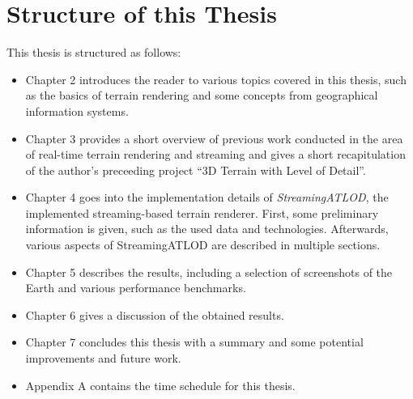 \section{Structure of this Thesis}
This thesis is structured as follows:
\begin{itemize}
  \item Chapter 2 introduces the reader to various topics covered in this thesis, such as 
  the basics of terrain rendering and some concepts from geographical information systems.
  \item Chapter 3 provides a short overview of previous work conducted in the area of real-time terrain rendering and streaming and 
        gives a short recapitulation of the author's preceeding project ``3D Terrain with Level of Detail''.
  \item Chapter 4 goes into the implementation details of \textit{StreamingATLOD}, the implemented streaming-based terrain renderer.
        First, some preliminary information is given, such as the used data and technologies.
        Afterwards, various aspects of StreamingATLOD are described in multiple sections.
  \item Chapter 5 describes the results, including a selection of screenshots of the Earth and various performance benchmarks.
  \item Chapter 6 gives a discussion of the obtained results.
  \item Chapter 7 concludes this thesis with a summary and some potential improvements and future work.
  \item Appendix A contains the time schedule for this thesis.
\end{itemize}
